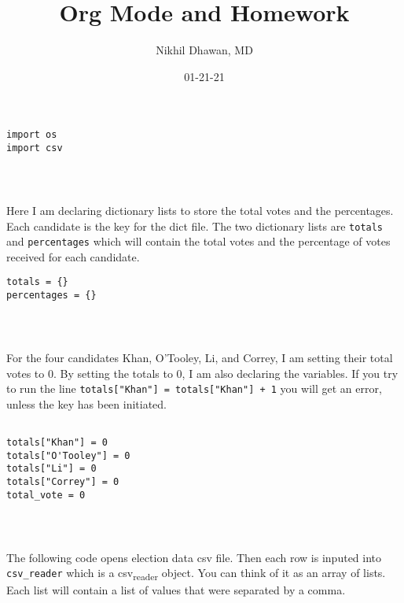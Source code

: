 \documentclass[11pt]{article}
\author{Nikhil Dhawan, MD}
\date{01-21-21}
\title{Org Mode and Homework}
\begin{document}
\maketitle
\tableofcontents

\begin{verbatim}
import os
import csv
\end{verbatim}

\begin{verbatim}



\end{verbatim}


Here I am declaring dictionary lists to store the total votes and the percentages. Each candidate is the key for the dict file. The two dictionary lists are \texttt{totals} and \texttt{percentages} which will contain the total votes and the percentage of votes received for each candidate. 

\begin{verbatim}
totals = {}
percentages = {}
\end{verbatim}

\begin{verbatim}



\end{verbatim}


For the four candidates Khan, O'Tooley, Li, and Correy, I am setting their total votes to 0. By setting the totals to 0, I am also declaring the variables. If you try to run the line \texttt{\texttt{totals["Khan"] = totals["Khan"] + 1}} you will get an error, unless the key has been initiated. 

\begin{verbatim}

totals["Khan"] = 0
totals["O'Tooley"] = 0
totals["Li"] = 0
totals["Correy"] = 0
total_vote = 0

\end{verbatim}

\begin{verbatim}



\end{verbatim}


The following code opens election data csv file. Then each row is inputed into \texttt{csv\_reader} which is a csv\textsubscript{reader} object. You can think of it as an array of lists. Each list will contain a list of values that were separated by a comma. 
\end{document}
